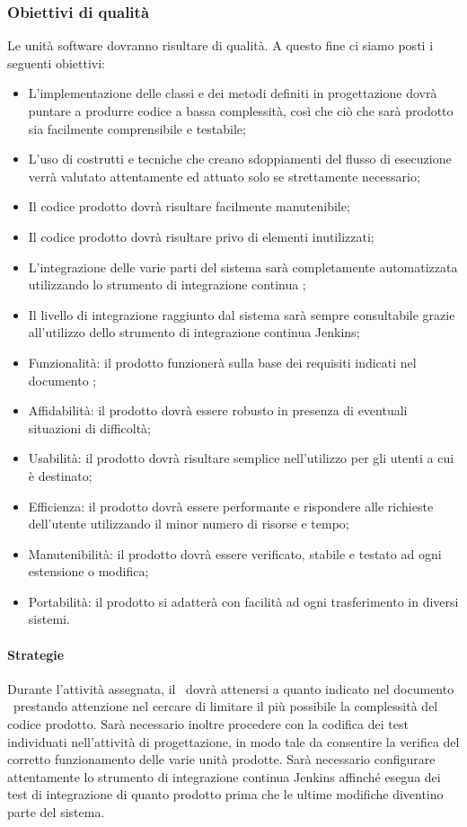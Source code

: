 \documentclass[../NormeDiProgetto.tex]{subfiles}
\begin{document}
			\subsubsection{Obiettivi di qualità}
			Le unità software dovranno risultare di qualità. A questo fine ci siamo posti i seguenti obiettivi:
			\begin{itemize}
				\item L'implementazione delle classi e dei metodi definiti in progettazione dovrà puntare a produrre codice a bassa complessità, così che ciò che sarà prodotto sia facilmente comprensibile e testabile;
				\item L'uso di costrutti e tecniche che creano sdoppiamenti del flusso di esecuzione verrà valutato attentamente ed attuato solo se strettamente necessario;
				\item Il codice prodotto dovrà risultare facilmente manutenibile;
				\item Il codice prodotto dovrà risultare privo di elementi inutilizzati;
				\item L'integrazione delle varie parti del sistema sarà completamente automatizzata utilizzando lo strumento di integrazione continua ;
				\item Il livello di integrazione raggiunto dal sistema sarà sempre consultabile grazie all'utilizzo dello strumento di integrazione continua Jenkins;
				\item Funzionalità: il prodotto funzionerà sulla base dei requisiti indicati nel documento \analisideirequisitiv;
				\item Affidabilità: il prodotto dovrà essere robusto in presenza di eventuali situazioni di difficoltà;
				\item Usabilità: il prodotto dovrà risultare semplice nell'utilizzo per gli utenti a cui è destinato;
				\item Efficienza: il prodotto dovrà essere performante e rispondere alle richieste dell'utente utilizzando il minor numero di risorse e tempo;
				\item Manutenibilità: il prodotto dovrà essere verificato, stabile e testato ad ogni estensione o modifica;
				\item Portabilità: il prodotto si adatterà con facilità ad ogni trasferimento in diversi sistemi.
			\end{itemize}
			
			\paragraph{Strategie}
			Durante l'attività assegnata, il \programmatore\ dovrà attenersi a quanto indicato nel documento \, prestando attenzione nel cercare di limitare il più possibile la complessità del codice prodotto. Sarà necessario inoltre procedere con la codifica dei test individuati nell'attività di progettazione, in modo tale da consentire la verifica del corretto funzionamento delle varie unità prodotte. Sarà necessario configurare attentamente lo strumento di integrazione continua Jenkins affinché esegua dei test di integrazione di quanto prodotto prima che le ultime modifiche diventino parte del sistema.
			
\end{document}
